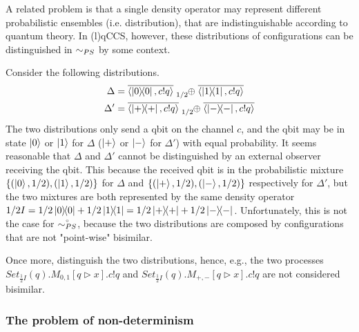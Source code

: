 A related problem is that a single density operator may represent different probabilistic ensembles (i.e. distribution), that are indistinguishable according to quantum theory. In (l)qCCS, however, these distributions of configurations can be
distinguished in $\sim_{PS}$ by some context. 
\begin{example}
	Consider the following distributions.
	\begin{align*}
		\Delta &= \overline{\confw{\ketbra{0}{0}, c!q}} \psum{1/2} \overline{\confw{\ketbra{1}{1}, c!q}}\\
		\Delta' &= \overline{\confw{\ketbra{+}{+}, c!q}} \psum{1/2} \overline{\confw{\ketbra{-}{-}, c!q}}
	\end{align*}
	The two distributions only send a qbit on the channel $c$, and the qbit may be in state $\ket{0}$ or $\ket{1}$ for $\Delta$ ($\ket{+}$ or $\ket{-}$ for $\Delta'$) with equal probability.
	It seems reasonable that $\Delta$ and $\Delta'$ cannot be distinguished by an external observer receiving the qbit.
	This because the received qbit is in the probabilistic mixture $\{(\ket{0}, 1/2), (\ket{1}, 1/2)\}$ for $\Delta$ and $\{(\ket{+}, 1/2), (\ket{-}, 1/2)\}$ respectively for $\Delta'$, but the two mixtures are both represented by the same density operator $1/2 I = 1/2 \ketbra{0}{0} + 1/2 \ketbra{1}{1} = 1/2 \ketbra{+}{+} + 1/2 \ketbra{-}{-}$.
	Unfortunately, this is not the case for $\stackrel{\scriptscriptstyle \circ}{\sim_{PS}}$, because the two distributions are composed by configurations that are not "point-wise" bisimilar.
\end{example}
Once more, \cite{fengBisimulationQuantumProcesses2012, dengOpenBisimulationQuantum2012} distinguish the two distributions, hence, e.g., the two processes $Set_{\frac{1}{2} I}(q).M_{0,1}[q \triangleright x].c!q$ and $Set_{\frac{1}{2} I}(q).M_{+,-}[q \triangleright x].c!q$ are not considered bisimilar.

\subsubsection*{The problem of non-determinism}

